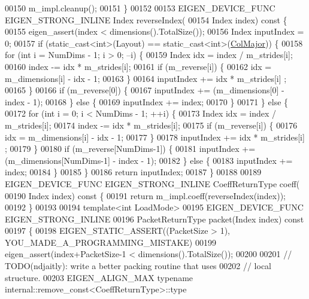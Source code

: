 \begin{DoxyCode}
00150     m\_impl.cleanup();
00151   \}
00152 
00153   EIGEN\_DEVICE\_FUNC EIGEN\_STRONG\_INLINE Index reverseIndex(
00154       Index index)\textcolor{keyword}{ const }\{
00155     eigen\_assert(index < dimensions().TotalSize());
00156     Index inputIndex = 0;
00157     \textcolor{keywordflow}{if} (static\_cast<int>(Layout) == static\_cast<int>(\hyperlink{group__enums_ggaacded1a18ae58b0f554751f6cdf9eb13a0cbd4bdd0abcfc0224c5fcb5e4f6669a}{ColMajor})) \{
00158       \textcolor{keywordflow}{for} (\textcolor{keywordtype}{int} i = NumDims - 1; i > 0; --i) \{
00159         Index idx = index / m\_strides[i];
00160         index -= idx * m\_strides[i];
00161         \textcolor{keywordflow}{if} (m\_reverse[i]) \{
00162           idx = m\_dimensions[i] - idx - 1;
00163         \}
00164         inputIndex += idx * m\_strides[i] ;
00165       \}
00166       \textcolor{keywordflow}{if} (m\_reverse[0]) \{
00167         inputIndex += (m\_dimensions[0] - index - 1);
00168       \} \textcolor{keywordflow}{else} \{
00169         inputIndex += index;
00170       \}
00171     \} \textcolor{keywordflow}{else} \{
00172       \textcolor{keywordflow}{for} (\textcolor{keywordtype}{int} i = 0; i < NumDims - 1; ++i) \{
00173         Index idx = index / m\_strides[i];
00174         index -= idx * m\_strides[i];
00175         \textcolor{keywordflow}{if} (m\_reverse[i]) \{
00176           idx = m\_dimensions[i] - idx - 1;
00177         \}
00178         inputIndex += idx * m\_strides[i] ;
00179       \}
00180       \textcolor{keywordflow}{if} (m\_reverse[NumDims-1]) \{
00181         inputIndex += (m\_dimensions[NumDims-1] - index - 1);
00182       \} \textcolor{keywordflow}{else} \{
00183         inputIndex += index;
00184       \}
00185     \}
00186     \textcolor{keywordflow}{return} inputIndex;
00187   \}
00188 
00189   EIGEN\_DEVICE\_FUNC EIGEN\_STRONG\_INLINE CoeffReturnType coeff(
00190       Index index)\textcolor{keyword}{ const  }\{
00191     \textcolor{keywordflow}{return} m\_impl.coeff(reverseIndex(index));
00192   \}
00193 
00194   \textcolor{keyword}{template}<\textcolor{keywordtype}{int} LoadMode>
00195   EIGEN\_DEVICE\_FUNC EIGEN\_STRONG\_INLINE
00196   PacketReturnType packet(Index index)\textcolor{keyword}{ const}
00197 \textcolor{keyword}{  }\{
00198     EIGEN\_STATIC\_ASSERT((PacketSize > 1), YOU\_MADE\_A\_PROGRAMMING\_MISTAKE)
00199     eigen\_assert(index+PacketSize-1 < dimensions().TotalSize());
00200 
00201     \textcolor{comment}{// TODO(ndjaitly): write a better packing routine that uses}
00202     \textcolor{comment}{// local structure.}
00203     EIGEN\_ALIGN\_MAX \textcolor{keyword}{typename} internal::remove\_const<CoeffReturnType>::type

\end{DoxyCode}
